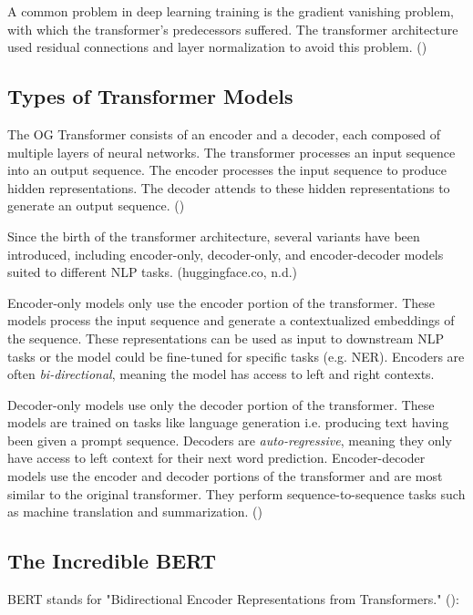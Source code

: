 A common problem in deep learning training is the gradient vanishing problem, with which the transformer's predecessors suffered.
The transformer architecture used residual connections and layer normalization to avoid this problem. (\cite{geron_hands-machine_2019})

\subsection{Types of Transformer Models}

The OG Transformer consists of an encoder and a decoder, each composed of multiple layers of neural networks. The transformer processes an input sequence into an output sequence. The encoder processes the input sequence to produce hidden representations. The decoder attends to these hidden representations to generate an output sequence. (\cite{vaswani_attention_2017})

Since the birth of the transformer architecture, several variants have been introduced, including encoder-only, decoder-only, and encoder-decoder models suited to different NLP tasks. (huggingface.co, n.d.)

Encoder-only models only use the encoder portion of the transformer. These models process the input sequence and generate a contextualized embeddings of the sequence. These representations can be used as input to downstream NLP tasks or the model could be fine-tuned for specific tasks (e.g. NER). Encoders are often \textit{bi-directional}, meaning the model has access to left and right contexts. \cite{tunstall_natural_2022}

Decoder-only models use only the decoder portion of the transformer. These models are trained on tasks like language generation i.e. producing text having been given a prompt sequence. Decoders are \textit{auto-regressive}, meaning they only have access to left context for their next word prediction.
Encoder-decoder models use the encoder and decoder portions of the transformer and are most similar to the original transformer. They perform sequence-to-sequence tasks such as machine translation and summarization. (\cite{tunstall_natural_2022})

\subsection{The Incredible BERT}

BERT stands for "Bidirectional Encoder Representations from Transformers." (\cite{vaswani_attention_2017}):


